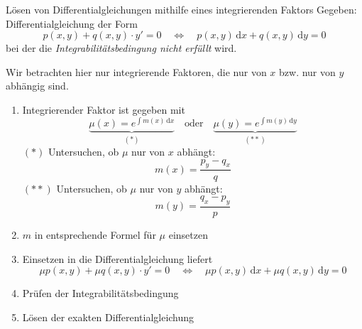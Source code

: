 \documentclass[german]{../spicker}
\renewcommand{\d}{\,\mathrm{d}}
\begin{document}
\begin{algo}{Lösen von Differentialgleichungen mithilfe eines integrierenden Faktors}
    Gegeben: Differentialgleichung der Form
    $$
        \boxed{p(x, y) + q(x, y) \cdot y' = 0 \quad \iff \quad p(x, y) \d x + q(x, y) \d y = 0}
    $$
    bei der die \emph{Integrabilitätsbedingung nicht erfüllt} wird.

    Wir betrachten hier nur integrierende Faktoren, die nur von $x$ bzw. nur von $y$ abhängig sind.

    \begin{enumerate}
        \item Integrierender Faktor ist gegeben mit
              $$
                  \underbrace{\mu(x) = e^{\int m(x) \d x}}_{(*)} \quad \text{oder} \quad \underbrace{\mu(y) = e^{\int m(y) \d y}}_{(**)}
              $$
              \subitem $(*)$ Untersuchen, ob $\mu$ nur von $x$ abhängt:
              $$
                  m(x) = \frac{p_y - q_x}{q}
              $$
              \subitem $(**)$ Untersuchen, ob $\mu$ nur von $y$ abhängt:
              $$
                  m(y) = \frac{q_x - p_y}{p}
              $$
        \item $m$ in entsprechende Formel für $\mu$ einsetzen
        \item Einsetzen in die Differentialgleichung liefert
              $$
                  \mu p(x, y) + \mu q(x, y) \cdot y' = 0 \quad \iff \quad \mu p(x, y) \d x + \mu q(x, y) \d y = 0
              $$
        \item Prüfen der Integrabilitätsbedingung
        \item Lösen der exakten Differentialgleichung
    \end{enumerate}
\end{algo}
\end{document}
